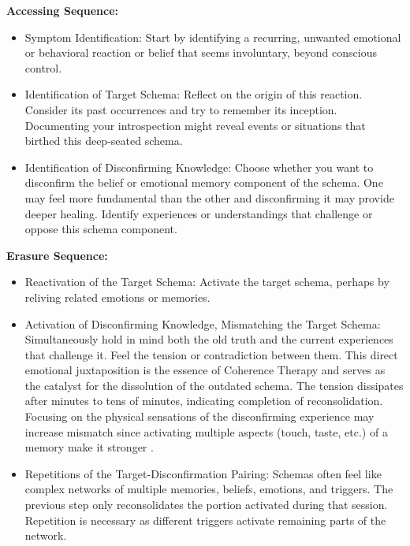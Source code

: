 \documentclass[12pt,letterpaper]{article}
\begin{document}
\noindent \textbf{Accessing Sequence:}
\begin{itemize}
    \item Symptom Identification: Start by identifying a recurring, unwanted emotional or behavioral reaction or belief that seems involuntary, beyond conscious control.
    \item Identification of Target Schema: Reflect on the origin of this reaction. Consider its past occurrences and try to remember its inception. Documenting your introspection might reveal events or situations that birthed this deep-seated schema. 
    \item Identification of Disconfirming Knowledge: Choose whether you want to disconfirm the belief or emotional memory component of the schema. One may feel more fundamental than the other and disconfirming it may provide deeper healing. Identify experiences or understandings that challenge or oppose this schema component. 
\end{itemize}
\noindent \textbf{Erasure Sequence:}
\begin{itemize}
    \item Reactivation of the Target Schema: Activate the target schema, perhaps by reliving related emotions or memories.
    \item Activation of Disconfirming Knowledge, Mismatching the Target Schema: Simultaneously hold in mind both the old truth and the current experiences that challenge it. Feel the tension or contradiction between them. This direct emotional juxtaposition is the essence of Coherence Therapy and serves as the catalyst for the dissolution of the outdated schema. The tension dissipates after minutes to tens of minutes, indicating completion of reconsolidation. Focusing on the physical sensations of the disconfirming experience may increase mismatch since activating multiple aspects (touch, taste, etc.) of a memory make it stronger \cite{brownAttachmentDisturbances,mayerMultimedia}.
    \item Repetitions of the Target-Disconfirmation Pairing: Schemas often feel like complex networks of multiple memories, beliefs, emotions, and triggers. The previous step only reconsolidates the portion activated during that session.  Repetition is necessary as different triggers activate remaining parts of the network.
\end{itemize}
\end{document}
